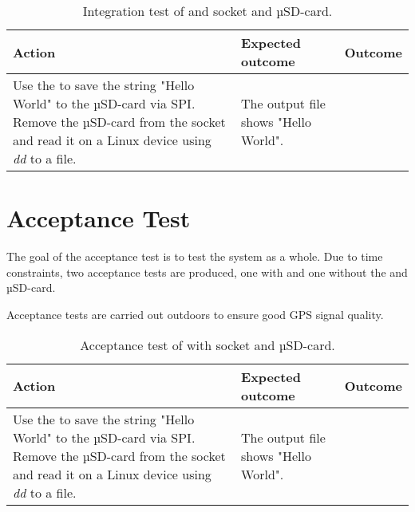 \begin{table}[H]
	\centering
	\begin{tabularx}{\textwidth}{p{4.3cm} X X}
		\toprule
		\textbf{Action} & \textbf{Expected outcome} & \textbf{Outcome} \\
		\midrule
		Use the \MKR to save the string "Hello World" to the µSD-card via SPI.
		Remove the µSD-card from the \SDsock socket and read it on a Linux device using \textit{dd} to a file. & The output file shows "Hello World". & \\
		\bottomrule
	\end{tabularx}
	\caption{Integration test of \MKR and \SDsock socket and µSD-card.}
	\label{AT:intSD}
\end{table}

\section{Acceptance Test}
The goal of the acceptance test is to test the system as a whole.
Due to time constraints, two acceptance tests are produced, one with and one without the \SDsock and µSD-card.

Acceptance tests are carried out outdoors to ensure good GPS signal quality.

\begin{table}[H]
	\centering
	\begin{tabularx}{\textwidth}{p{4.3cm} X X}
		\toprule
		\textbf{Action} & \textbf{Expected outcome} & \textbf{Outcome} \\
		\midrule
		Use the \MKR to save the string "Hello World" to the µSD-card via SPI.
		Remove the µSD-card from the \SDsock socket and read it on a Linux device using \textit{dd} to a file. & The output file shows "Hello World". & \\
		\bottomrule
	\end{tabularx}
	\caption{Acceptance test of \systemName with  \SDsock socket and µSD-card.}
	\label{AT:withSD}
\end{table}

\FloatBarrier